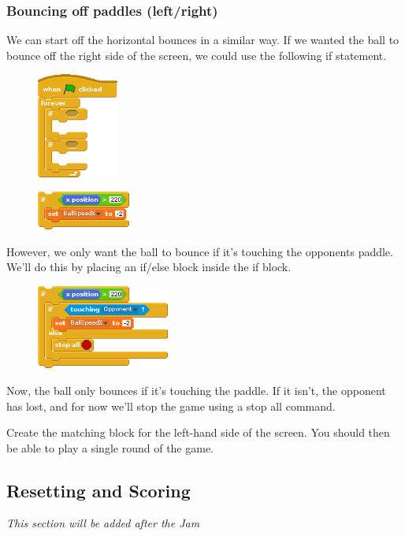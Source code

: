 		\subsubsection{Bouncing off paddles (left/right)}
		
			We can start off the horizontal bounces in a similar way. If we wanted the ball to bounce off the right side of the screen, we could use the following if statement.
		
			\begin{figure}[h!]
				\centering
				\includegraphics[width=101px]{McrRaspJam/018_ScratchGames/code/2_loop}
				\label{fig:ballloop2}
			\end{figure}
		
			\begin{figure}[h!]
				\centering
				\includegraphics[width=116px]{McrRaspJam/018_ScratchGames/code/4_paddle1}
				\label{fig:paddle1}
			\end{figure}
		
			\pagebreak[4]
			However, we only want the ball to bounce if it's touching the opponents paddle. We'll do this by placing an if/else block inside the if block.
			
			\begin{figure}[h!]
				\centering
				\includegraphics[width=165px]{McrRaspJam/018_ScratchGames/code/4_paddle2}
				\label{fig:paddle2}
			\end{figure}
			
			Now, the ball only bounces if it's touching the paddle. If it isn't, the opponent has lost, and for now we'll stop the game using a stop all command.
			
			Create the matching block for the left-hand side of the screen. You should then be able to play a single round of the game.
			
	\subsection{Resetting and Scoring}
	
		\textit{This section will be added after the Jam}